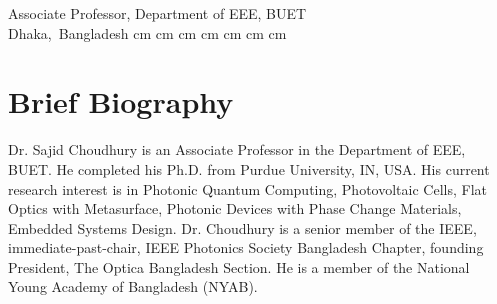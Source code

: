 \documentclass[cvauthor={Dr. Sajid Muhaimin Choudhury}]{buetcv}
\begin{document}
    \placelastupdatedtext %
    \begin{header}
        \fontsize{30 pt}{30 pt}
        \textbf{\cvauthor}

        \vspace{0.2 cm}
        \fontsize{20 pt}{20 pt}
        Associate Professor, Department of EEE, BUET \\
        \vspace{0.2 cm}        
        \normalsize
        \mbox{{\footnotesize\faMapMarker*}\hspace*{0.13cm}Dhaka, Bangladesh}%
         cm%
        \AND%
         cm%
        \mbox{}%
         cm%
        \AND%
         cm%
        \mbox{}%
         cm%
        \AND%
         cm%
        \mbox{}%
         cm%
    \end{header}

    \vspace{0.3 cm - 0.3 cm}


    \section{Brief Biography}
        \begin{onecolentry}
            Dr. Sajid Choudhury is an Associate Professor in the Department of EEE, BUET. He completed his Ph.D. from Purdue University, IN, USA. His current research interest is in Photonic Quantum Computing, Photovoltaic Cells, Flat Optics with Metasurface, Photonic Devices with Phase Change Materials, Embedded Systems Design. Dr. Choudhury is a senior member of the IEEE, immediate-past-chair, IEEE Photonics Society Bangladesh Chapter, founding President, The Optica Bangladesh Section.  He is a member of the National Young Academy of Bangladesh (NYAB).
        \end{onecolentry}
\end{document}
